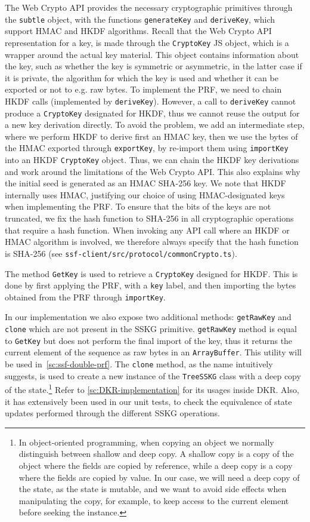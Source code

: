 The Web Crypto API provides the necessary cryptographic primitives
through the \texttt{subtle} object, with the functions
\texttt{generateKey} and \texttt{deriveKey},
which support HMAC and HKDF algorithms.
Recall that the Web Crypto API representation for a
key, is made through the \texttt{CryptoKey} JS object,
which is a wrapper around the actual key material.
This object contains information about the key, such as
whether the key is symmetric or asymmetric, in the latter
case if it is private, the algorithm for which the key is used
and whether it can be exported or not to e.g. raw bytes.
To implement the PRF, we need to chain HKDF calls (implemented by \texttt{deriveKey}).
However, a call to \texttt{deriveKey} cannot produce a \texttt{CryptoKey}
designated for HKDF, thus we cannot reuse the output for a new
key derivation directly. 
To avoid the problem, we add an intermediate step,
where we perform HKDF to derive first an HMAC key,
then we use the bytes of the HMAC exported through
\texttt{exportKey}, by re-import them
using \texttt{importKey}
into an HKDF \texttt{CryptoKey} object.
Thus, we can chain the HKDF key derivations and work around the limitations
of the Web Crypto API.
This also explains why the initial seed is generated as an HMAC SHA-256 key.
We note that HKDF internally uses HMAC,
justifying our choice of using HMAC-designated
keys when implementing the PRF.
To ensure that the bits of the keys are not truncated,
we fix the hash function to SHA-256 in all cryptographic
operations that require a hash function.
When invoking any API call where an HKDF or HMAC algorithm is involved,
we therefore always specify that the hash function is SHA-256 (see \texttt{ssf-client/src/protocol/commonCrypto.ts}). 

The method \texttt{GetKey}
is used to retrieve a \texttt{CryptoKey} designed for HKDF.
This is done by first applying the PRF, with a \texttt{key} label, and then importing the bytes obtained from the PRF
through \texttt{importKey}. 

In our implementation we also expose two additional methods:
\texttt{getRawKey} and \texttt{clone} which are not present 
in the SSKG primitive. 
\texttt{getRawKey} method is equal to \texttt{GetKey}
but does not perform the final import of the key, thus it 
returns the current element of the sequence as raw bytes
in an \texttt{ArrayBuffer}. 
This utility will be used in~\cref{sc:ssf-double-prf}.
The \texttt{clone} method, as the name intuitively suggests, 
is used to create a new instance
of the \texttt{TreeSSKG} class with a deep copy of the state.\footnote{In object-oriented programming, when copying an object we normally distinguish between shallow and deep copy. 
A shallow copy is a copy of the object where the fields are 
copied by reference, while a deep copy is a copy where the 
fields are copied by value. 
In our case, we will need a deep copy of the state, 
as the state is mutable, and we want to avoid side effects 
when manipulating the copy, for example, to keep access to the current element before seeking the instance.} 
Refer to \cref{sc:DKR-implementation} for its usages inside DKR. 
Also, it has extensively been used in our unit tests, to check the equivalence
of state updates performed through the different SSKG operations.

